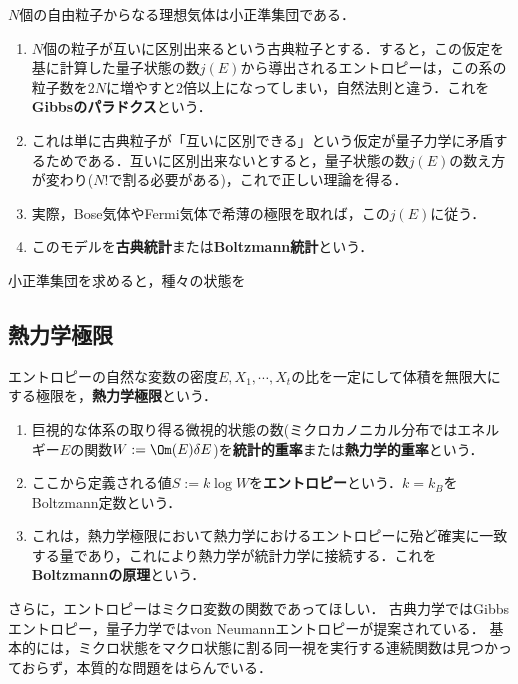 \documentclass[uplatex,dvipdfmx]{jsreport}
\begin{document}
\begin{example}
    $N$個の自由粒子からなる理想気体は小正準集団である．
    \begin{enumerate}
        \item $N$個の粒子が互いに区別出来るという古典粒子とする．すると，この仮定を基に計算した量子状態の数$j(E)$から導出されるエントロピーは，この系の粒子数を$2N$に増やすと2倍以上になってしまい，自然法則と違う．これを\textbf{Gibbsのパラドクス}という．
        \item これは単に古典粒子が「互いに区別できる」という仮定が量子力学に矛盾するためである．互いに区別出来ないとすると，量子状態の数$j(E)$の数え方が変わり($N!$で割る必要がある)，これで正しい理論を得る．
        \item 実際，Bose気体やFermi気体で希薄の極限を取れば，この$j(E)$に従う．
        \item このモデルを\textbf{古典統計}または\textbf{Boltzmann統計}という．
    \end{enumerate}
\end{example}
\begin{remarks}
    小正準集団を求めると，種々の状態を
\end{remarks}

\subsection{熱力学極限}

\begin{tcolorbox}[colframe=ForestGreen, colback=ForestGreen!10!white,breakable,colbacktitle=ForestGreen!40!white,coltitle=black,fonttitle=\bfseries\sffamily,
title=]
    エントロピーの自然な変数の密度$E,X_1,\cdots,X_t$の比を一定にして体積を無限大にする極限を，\textbf{熱力学極限}という．
\end{tcolorbox}

\begin{definition}\mbox{}
    \begin{enumerate}
        \item 巨視的な体系の取り得る微視的状態の数(ミクロカノニカル分布ではエネルギー$E$の関数$W:=\Om(E)\delta E$)を\textbf{統計的重率}または\textbf{熱力学的重率}という．
        \item ここから定義される値$S:=k\log W$を\textbf{エントロピー}という．$k=k_B$をBoltzmann定数という．
        \item これは，熱力学極限において熱力学におけるエントロピーに殆ど確実に一致する量であり，これにより熱力学が統計力学に接続する．これを\textbf{Boltzmannの原理}という．
    \end{enumerate}
\end{definition}
\begin{remark}
    さらに，エントロピーはミクロ変数の関数であってほしい．
    古典力学ではGibbsエントロピー，量子力学ではvon Neumannエントロピーが提案されている．
    基本的には，ミクロ状態をマクロ状態に割る同一視を実行する連続関数は見つかっておらず，本質的な問題をはらんでいる．
\end{remark}
\end{document}
